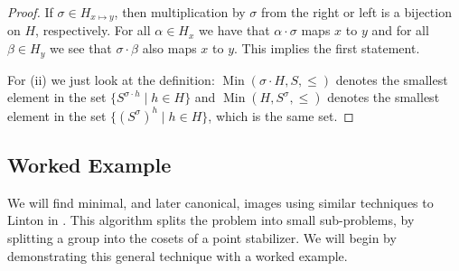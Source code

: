 \documentclass[preprint,12pt]{elsarticle}
\newcommand{\Min}{\operatorname{Min}}
\begin{document}
\begin{proof}
  If $\sigma \in H_{x \mapsto y}$, then multiplication by $\sigma$ from the
  right or left is a bijection on $H$, respectively. For all $\alpha \in H_x$ we
  have that $\alpha \cdot \sigma$ maps $x$ to $y$ and for all $\beta \in H_y$ we
  see that $\sigma \cdot \beta$ also maps $x$ to $y$. This implies the first
  statement.

  For (ii) we just look at the definition: $\Min(\sigma \cdot H, S, \leq)$ denotes
  the smallest element in the
  set $\{S^{\sigma\cdot h} \mid h \in H\}$ and $\Min(H, S^{\sigma}, \leq)$
  denotes the smallest element in the set $\{(S^\sigma)^h \mid h \in H\}$,
  which is the same set.
\end{proof}

\subsection{Worked Example}

We will find minimal, and later canonical, images using similar techniques to
Linton in \cite{Linton:SmallestImage}. This algorithm splits the problem into
small sub-problems, by splitting a group into the cosets of a point stabilizer.
We will begin by demonstrating this general technique with a worked
example.
\end{document}
